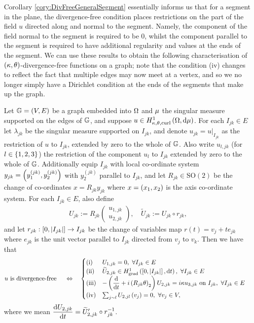 Corollary \ref{cory:DivFreeGeneralSegment} essentially informs us that for a segment in the plane, the divergence-free condition places restrictions on the part of the field $u$ directed along and normal to the segment.
Namely, the component of the field normal to the segment is required to be $0$, whilst the component parallel to the segment is required to have additional regularity and values at the ends of the segment.
We can use these results to obtain the following characterisation of $\left( \kappa, \theta \right)$-divergence-free functions on a graph; note that the condition (iv) changes to reflect the fact that multiple edges may now meet at a vertex, and so we no longer simply have a Dirichlet condition at the ends of the segments that make up the graph.
\begin{theorem} \label{thm:DivFreeWholeGraph}
	Let $\mathbb{G}=\left( V,E \right)$ be a graph embedded into $\Omega$ and $\mu$ the singular measure supported on the edges of $\mathbb{G}$, and suppose $u\in H^1_{\kappa,\theta,\mathrm{curl}}\left( \Omega, \mathrm{d}\mu \right)$.
	For each $I_{jk}\in E$ let $\lambda_{jk}$ be the singular measure supported on $I_{jk}$, and denote $u_{jk} = u\vert_{I_{jk}}$ as the restriction of $u$ to $I_{jk}$, extended by zero to the whole of $\mathbb{G}$.
	Also write $u_{l,jk}$ (for $l\in\left\{ 1,2,3 \right\}$) the restriction of the component $u_l$ to $I_{jk}$ extended by zero to the whole of $\mathbb{G}$.
	Additionally equip $I_{jk}$ with local co-ordinate system $y_{jk}=\left( y_1^{(jk)}, y_2^{(jk)} \right)$ with $y_2^{(jk)}$ parallel to $I_{jk}$, and let $R_{jk}\in\mathrm{SO}(2)$ be the change of co-ordinates $x=R_{jk}y_{jk}$ where $x=\left( x_1,x_2 \right)$ is the axis co-ordinate system.
	For each $I_{jk}\in E$, also define
	\begin{align*}
		U_{jk} := R_{jk}\begin{pmatrix} u_{1,jk} \\ u_{2,jk} \end{pmatrix}, \quad
		\widetilde{U}_{jk} := U_{jk} \circ r_{jk},
	\end{align*}
	and let $r_{jk}:\left[ 0,\left\lvert I_{jk} \right\rvert \right]\rightarrow I_{jk}$ be the change of variables map $r(t)=v_{j} + te_{jk}$ where $e_{jk}$ is the unit vector parallel to $I_{jk}$ directed from $v_j$ to $v_k$.
	Then we have that
	\begin{align*}
		u \text{ is divergence-free } &\quad\Leftrightarrow\quad
		\begin{cases}
		\mathrm{(i)} & U_{1,jk} = 0, \ \forall I_{jk}\in E\\
		\mathrm{(ii)} & \widetilde{U}_{2,jk} \in \gradSob{\interval{I_{jk}}}{t}, \ \forall I_{jk}\in E \\
		\mathrm{(iii)} & -\bracs{\diff{}{t} + i\bracs{R_{jk}\qm}_2}U_{2,jk} = i\wavenumber u_{3,jk} \text{ on } I_{jk}, \ \forall I_{jk}\in E\\
		\mathrm{(iv)} & \sum_{j\con l}U_{2,jl}\bracs{v_j} = 0, \ \forall v_j\in V,
		\end{cases}
	\end{align*}
	where we mean $\dfrac{\mathrm{d}U_{2,jk}}{\mathrm{d}t} = \widetilde{U}_{2,jk}' \circ r_{jk}^{-1}$.
\end{theorem}
